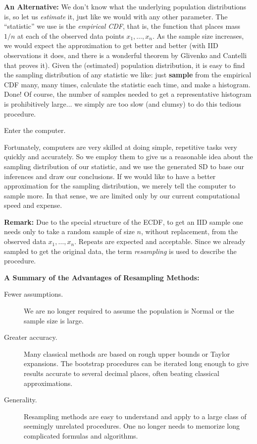 \documentclass[captions=tableheading]{scrbook}
\begin{document}
\textbf{An Alternative:} We don't know what the underlying population distributions is, so let us \emph{estimate} it, just like we would with any other parameter. The ``statistic'' we use is the \emph{empirical CDF}, that is, the function that places mass $1/n$ at each of the observed data points $x_{1},\ldots,x_{n}$. As the sample size increases, we would expect the approximation to get better and better (with IID observations it does, and there is a wonderful theorem by Glivenko and Cantelli that proves it). Given the (estimated) population distribution, it is easy to find the sampling distribution of any statistic we like: just \textbf{sample} from the empirical CDF many, many times, calculate the statistic each time, and make a histogram. Done! Of course, the number of samples needed to get a representative histogram is prohibitively large$\ldots$ we simply are too slow (and clumsy) to do this tedious procedure.

\begin{center}
Enter the computer. 
\end{center}

Fortunately, computers are very skilled at doing simple, repetitive tasks very quickly and accurately. So we employ them to give us a reasonable idea about the sampling distribution of our statistic, and we use the generated SD to base our inferences and draw our conclusions. If we would like to have a better approximation for the sampling distribution, we merely tell the computer to sample more. In that sense, we are limited only by our current computational speed and expense.

\textbf{Remark:} Due to the special structure of the ECDF, to get an IID sample one needs only to take a random sample of size $n$, without replacement, from the observed data $x_{1},\ldots,x_{n}$. Repeats are expected and acceptable. Since we already sampled to get the original data, the term \emph{resampling} is used to describe the procedure.

\textbf{A Summary of the Advantages of Resampling Methods:}


\begin{description}
\item[Fewer assumptions.] We are no longer required to assume the population is Normal or the sample size is large.
\item[Greater accuracy.] Many classical methods are based on rough upper bounds or Taylor expansions. The bootstrap procedures can be iterated long enough to give results accurate to several decimal places, often beating classical approximations.
\item[Generality.] Resampling methods are easy to understand and apply to a large class of seemingly unrelated procedures. One no longer needs to memorize long complicated formulas and algorithms.
\end{description}
\end{document}
